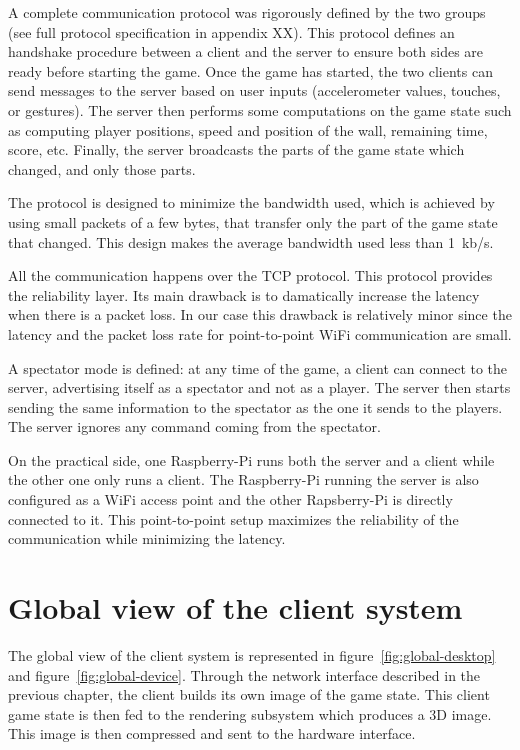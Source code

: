 \documentclass[english, DIV=13]{scrreprt}
\begin{document}
A complete communication protocol was rigorously defined by the two groups (see full
protocol specification in appendix XX).
This protocol defines an handshake procedure between a client and the server to ensure both
sides are ready before starting the game.
Once the game has started, the two clients can send
messages to the server based on user inputs (accelerometer values, touches, or gestures).
The server then performs some computations on the game state such as computing player
positions, speed and position of the wall, remaining time, score, etc. Finally, the server
broadcasts the parts of the game state which changed, and only those parts.

The protocol is designed to minimize the bandwidth used, which is achieved by using small packets
of a few bytes, that transfer only the part of the game state that changed.
This design makes the average bandwidth used less than \SI{1}{kb/s}.

All the communication happens over the TCP protocol. This protocol provides the reliability
layer. Its main drawback is to damatically increase the latency when there is a packet loss.
In our case this drawback is relatively minor since the latency and the packet loss rate
for point-to-point WiFi communication are small.

A spectator mode is defined: at any time of the game, a client can connect to the server,
advertising itself as a spectator and not as a player. The server then starts sending the
same information to the spectator as the one it sends to the players. The server ignores
any command coming from the spectator.

On the practical side, one Raspberry-Pi runs both the server and a client while the other
one only runs a client.
The Raspberry-Pi running the server is also configured as a WiFi access point and the other
Rapsberry-Pi is directly connected to it. This point-to-point setup maximizes the
reliability of the communication while minimizing the latency.

\chapter{Global view of the client system}
\label{chap:global-view}

The global view of the client system is represented in figure~\ref{fig:global-desktop}
and figure~\ref{fig:global-device}. Through the network interface described in the
previous chapter, the client builds its own image of the game state. This client game
state is then fed to the rendering subsystem which produces a 3D image. This image
is then compressed and sent to the hardware interface.
\end{document}
